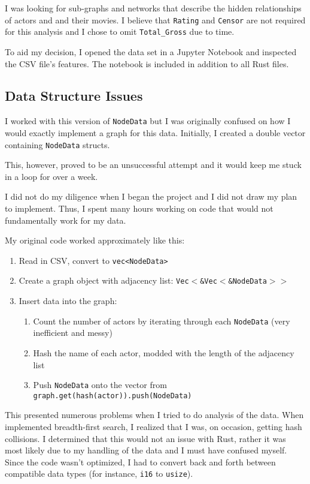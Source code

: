 \documentclass[12pt,letterpaper]{article}
\begin{document}
I was looking for sub-graphs and networks that describe the hidden relationships of actors and and their movies.  I believe that \texttt{Rating} and \texttt{Censor} are not required for this analysis and I chose to omit \texttt{Total\_Gross} due to time. 

To aid my decision, I opened the data set in a Jupyter Notebook and inspected the CSV file's features. The notebook is included in addition to all Rust files. 

\subsection{Data Structure Issues}

I worked with this version of \texttt{NodeData} but I was originally confused on how I would exactly implement a graph for this data. Initially, I created a double vector containing \texttt{NodeData} structs.  

This, however, proved to be an unsuccessful attempt and it would keep me stuck in a loop for over a week. 

I did not do my diligence when I began the project and I did not draw my plan to implement. Thus,  I spent many hours working on code that would not fundamentally work for my data. 

My original code worked approximately like this: 

\begin{enumerate}
\item Read in CSV,  convert to \texttt{vec<NodeData>}
\item Create a graph object with adjacency list: \texttt{Vec$<$\&Vec$<$\&NodeData$>>$}
\item Insert data into the graph:
	\begin{enumerate}
		\item Count the number of actors by iterating through each \texttt{NodeData} (very inefficient and messy) 
		\item Hash the name of each actor,  modded with the length of the adjacency list
		\item Push \texttt{NodeData} onto the vector from \texttt{graph.get(hash(actor)).push(NodeData)}
	\end{enumerate}

\end{enumerate}

This presented numerous problems when I tried to do analysis of the data.  When implemented breadth-first search, I realized that I was, on occasion,  getting hash collisions. I determined that this would not an issue with Rust, rather it was most likely due to my handling of the data and I must have confused myself.  Since the code wasn't optimized, I had to convert back and forth between compatible data types (for instance, \texttt{i16} to \texttt{usize}). 
\end{document}
